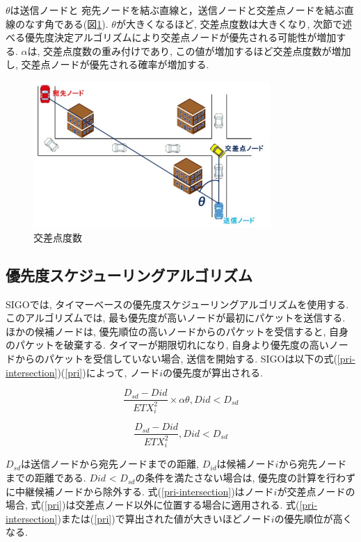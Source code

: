 \documentclass[technicalreport]{ieicej}
\begin{document}
  $θ$は送信ノードと 宛先ノードを結ぶ直線と，送信ノードと交差点ノードを結ぶ直線のなす角である(図\ref{fig:Intersection}). 
  $θ$が大きくなるほど, 交差点度数は大きくなり, 次節で述べる優先度決定アルゴリズムにより交差点ノードが優先される可能性が増加する. $α$は, 交差点度数の重み付けであり, この値が増加するほど交差点度数が増加し, 交差点ノードが優先される確率が増加する. 
 
 \begin{figure}[!ht]
\centering
\includegraphics[width=90mm]{figures/Intersection.eps}
\caption{交差点度数}
\label{fig:Intersection}
\end{figure}

\subsection{優先度スケジューリングアルゴリズム}
SIGOでは, タイマーベースの優先度スケジューリングアルゴリズムを使用する. このアルゴリズムでは, 最も優先度が高いノードが最初にパケットを送信する. ほかの候補ノードは, 優先順位の高いノードからのパケットを受信すると, 自身のパケットを破棄する. タイマーが期限切れになり, 自身より優先度の高いノードからのパケットを受信していない場合, 送信を開始する. SIGOは以下の式(\ref{pri-intersection})(\ref{pri})によって, ノード$i$の優先度が算出される.


\begin{equation}
\label{pri-intersection}
\frac{D_{sd} - D{id}}{ETX_{i}^{2}} \times αθ,  D{id} < D_{sd}
\end{equation}

\begin{equation}
\label{pri}
\frac{D_{sd} - D{id}}{ETX_{i}^{2}} ,   D{id} < D_{sd}
\end{equation}

$D_{sd}$は送信ノードから宛先ノードまでの距離, $D_{id}$は候補ノード$i $から宛先ノードまでの距離である.  $D{id}$ < $D_{sd}$の条件を満たさない場合は, 優先度の計算を行わずに中継候補ノードから除外する. 式(\ref{pri-intersection})はノード$i$が交差点ノードの場合, 式(\ref{pri})は交差点ノード以外に位置する場合に適用される. 式(\ref{pri-intersection})または(\ref{pri})で算出された値が大きいほどノード$i$の優先順位が高くなる. 
\end{document}
